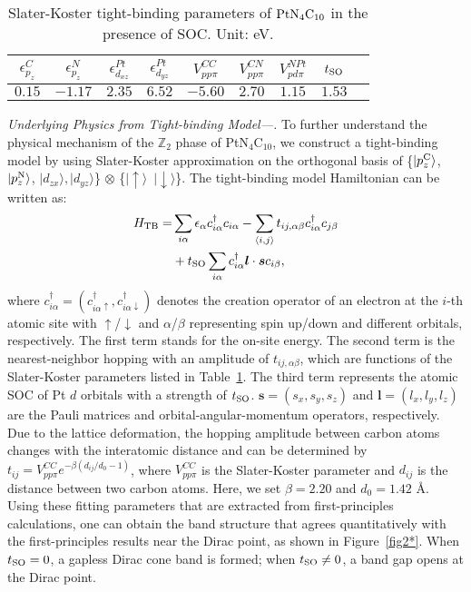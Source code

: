 \documentclass[aps,prl,twocolumn,showpacs,superscriptaddress]{revtex4-1}
\begin{document}
\begin{table}
	\centering
	\renewcommand\arraystretch{2}
	\begin{tabular}{ccccccccc}
		\hline \hline
		$\epsilon^C_{p_{z}}$ & $\epsilon^N_{p_{z}}$ & $\epsilon^{Pt}_{d_{xz}}$ & $\epsilon^{Pt}_{d_{yz}}$ & $V^{CC}_{pp\pi}$ & $V^{CN}_{pp\pi}$ & $V^{NPt}_{pd\pi}$ & $t_{\rm SO}$ \\
		\hline
		$0.15$ & $-1.17$ & $2.35$ & $6.52$ & $-5.60$ & $2.70$ & $1.15$ & $1.53$ \\
		\hline \hline
	\end{tabular}
	\caption{Slater-Koster tight-binding parameters of ${\rm PtN_4C_{10}}$ in the presence of SOC. Unit: eV.}
    \label{tab-2}
\end{table}

\textit{Underlying Physics from Tight-binding Model---.} To further understand the physical mechanism of the $\mathbb{Z}_2$ phase of PtN$_4$C$_{10}$, we construct a tight-binding model by using Slater-Koster approximation on the orthogonal basis of \{$|p^{\rm C}_{z}\rangle$, $|p^{\rm N}_{z}\rangle$, $|d_{zx}\rangle, |d_{yz}\rangle$\} $\otimes$ \{$|\uparrow\rangle$\, $|\downarrow\rangle$\}. The tight-binding model Hamiltonian can be written as:
\begin{eqnarray}
\begin{aligned}
  H_{\rm TB}=&\sum_{i\alpha}\epsilon_{\alpha}c_{i\alpha}^{\dagger}c_{i\alpha}-\sum_{\langle i,j \rangle}t_{ij,\alpha\beta}c_{i\alpha}^{\dagger}c_{j\beta}\\
  	&+t_{\rm SO}\sum_{i\alpha} c_{i\alpha}^{\dagger}\bm{l}\cdot\bm{s}c_{i\beta},
\end{aligned}
\end{eqnarray}
where $c^\dagger_{i\alpha}=(c^\dagger_{i\alpha\uparrow},c^\dagger_{i\alpha\downarrow})$ denotes the creation operator of an electron at the $i$-th atomic site with $\uparrow$/$\downarrow$ and $\alpha$/$\beta$ representing spin up/down and different orbitals, respectively. The first term stands for the on-site energy. The second term is the nearest-neighbor hopping with an amplitude of $t_{ij,\alpha\beta}$, which are functions of the Slater-Koster parameters listed in Table~\ref{tab-2}. The third term represents the atomic SOC of Pt $d$ orbitals with a strength of $t_{\rm SO}$. $\bm{s}=(s_x, s_y, s_z)$ and $\bm{l}=(l_x, l_y, l_z)$ are the Pauli matrices and orbital-angular-momentum operators, respectively. Due to the lattice deformation, the hopping amplitude between carbon atoms changes with the interatomic distance and can be determined by $t_{ij}=V^{CC}_{pp\pi}e^{-\beta(d_{ij}/d_0-1)}$, where $V^{CC}_{pp\pi}$ is the Slater-Koster parameter and $d_{ij}$ is the distance between two carbon atoms. Here, we set $\beta=2.20$ and $d_0=1.42$ \AA. Using these fitting parameters that are extracted from first-principles calculations, one can obtain the band structure that agrees quantitatively with the first-principles results near the Dirac point, as shown in Figure~\ref{fig2*}. When $t_{\rm SO}=0$, a gapless Dirac cone band is formed; when $t_{\rm SO}\neq 0$, a band gap opens at the Dirac point.
\end{document}
